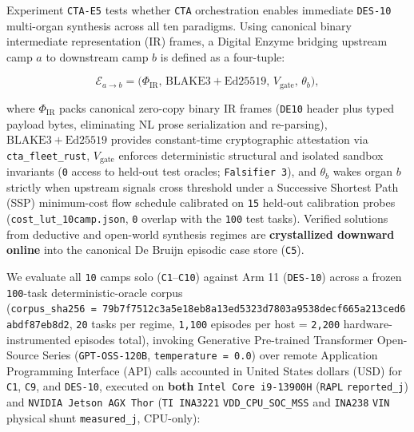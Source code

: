 \documentclass[10pt,letterpaper]{article}
\begin{document}
Experiment \texttt{CTA-E5} tests whether \texttt{CTA} orchestration
enables immediate \texttt{DES-10} multi-organ synthesis across all ten
paradigms. Using canonical binary intermediate representation (IR)
frames, a Digital Enzyme bridging upstream camp \(a\) to downstream camp
\(b\) is defined as a four-tuple:

\[
\mathcal{E}_{a \to b} = \bigl(\Phi_{\mathrm{IR}},\, \mathrm{BLAKE3} + \mathrm{Ed25519},\, V_{\mathrm{gate}},\, \theta_b\bigr),
\]

where \(\Phi_{\mathrm{IR}}\) packs canonical zero-copy binary IR frames
(\texttt{DE10} header plus typed payload bytes, eliminating NL prose
serialization and re-parsing), \(\mathrm{BLAKE3} + \mathrm{Ed25519}\)
provides constant-time cryptographic attestation via
\texttt{cta\_\allowbreak{}fleet\_\allowbreak{}rust}, \(V_{\mathrm{gate}}\) enforces deterministic
structural and isolated sandbox invariants (\texttt{0} access to
held-out test oracles; \texttt{Falsifier\ 3}), and \(\theta_b\) wakes
organ \(b\) strictly when upstream signals cross threshold under a
Successive Shortest Path (SSP) minimum-cost flow schedule calibrated on
\texttt{15} held-out calibration probes
(\texttt{cost\_\allowbreak{}lut\_\allowbreak{}10camp.\allowbreak{}json}, \texttt{0} overlap with the
\texttt{100} test tasks). Verified solutions from deductive and
open-world synthesis regimes are \textbf{crystallized downward online}
into the canonical De Bruijn episodic case store (\texttt{C5}).

We evaluate all \texttt{10} camps solo (\texttt{C1}--\texttt{C10})
against Arm 11 (\texttt{DES-10}) across a frozen \texttt{100}-task
deterministic-oracle corpus
(\texttt{corpus\_\allowbreak{}sha256\ =\ 79b7f751\allowbreak{}2c3a5e18\allowbreak{}eb8a13ed\allowbreak{}5323d780\allowbreak{}3a9538de\allowbreak{}cf665a21\allowbreak{}3ced6abd\allowbreak{}f87eb8d2},
\texttt{20} tasks per regime, \texttt{1,100} episodes per host =
\texttt{2,200} hardware-instrumented episodes total), invoking
Generative Pre-trained Transformer Open-Source Series
(\texttt{GPT-\allowbreak{}OSS-\allowbreak{}120B}, \texttt{temperature\ =\ 0.\allowbreak{}0}) over remote
Application Programming Interface (API) calls accounted in United States
dollars (USD) for \texttt{C1}, \texttt{C9}, and \texttt{DES-10},
executed on \textbf{both} \texttt{Intel\ Core\ i9-\allowbreak{}13900H} (\texttt{RAPL}
\texttt{reported\_\allowbreak{}j}) and \texttt{NVIDIA\ Jetson\ AGX\ Thor}
(\texttt{TI\ INA3221} \texttt{VDD\_\allowbreak{}CPU\_\allowbreak{}SOC\_\allowbreak{}MSS} and \texttt{INA238}
\texttt{VIN} physical shunt \texttt{measured\_\allowbreak{}j}, CPU-only):
\end{document}
